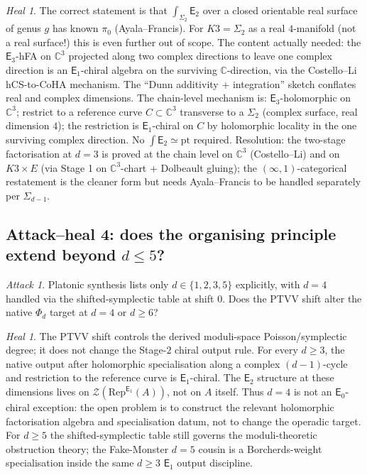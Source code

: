 \documentclass[11pt]{article}
\theoremstyle{definition}
\theoremstyle{remark}
\newtheorem{attack}[theorem]{Attack}
\newtheorem{heal}[theorem]{Heal}
\providecommand{\C}{\mathbb{C}}
\providecommand{\cZ}{\mathcal{Z}}
\providecommand{\Eone}{\mathsf{E}_1}
\providecommand{\Etwo}{\mathsf{E}_2}
\providecommand{\Ethree}{\mathsf{E}_3}
\providecommand{\Rep}{\mathrm{Rep}}
\providecommand{\Ezero}{\mathsf{E}_0}
\begin{document}
\begin{heal}
The correct statement is that $\int_{\Sigma_2}\Etwo$ over a closed
orientable real surface of genus $g$ has known $\pi_0$ (Ayala--Francis).
For $K3 = \Sigma_2$ as a real $4$-manifold (not a real surface!) this
is even further out of scope. The content actually needed: the
$\Ethree$-hFA on $\C^3$ projected along two complex directions to
leave one complex direction is an $\Eone$-chiral algebra on the
surviving $\C$-direction, via the Costello--Li hCS-to-CoHA mechanism.
The ``Dunn additivity + integration'' sketch conflates real and complex
dimensions. The chain-level mechanism is: $\Ethree$-holomorphic on
$\C^3$; restrict to a reference curve $C\subset\C^3$ transverse to a
$\Sigma_2$ (complex surface, real dimension $4$); the restriction is
$\Eone$-chiral on $C$ by holomorphic locality in the one surviving
complex direction. No $\int\Etwo\simeq\mathrm{pt}$ required.
Resolution: the two-stage factorisation at $d = 3$ is proved at the
chain level on $\C^3$ (Costello--Li) and on $K3\times E$ (via Stage 1
on $\C^3$-chart + Dolbeault gluing); the $(\infty,1)$-categorical
restatement is the cleaner form but needs Ayala--Francis to be handled
separately per $\Sigma_{d-1}$.
\end{heal}

\subsection{Attack--heal 4: does the organising principle extend
beyond $d \leq 5$?}

\begin{attack}
Platonic synthesis lists only $d \in \{1, 2, 3, 5\}$ explicitly, with
$d=4$ handled via the shifted-symplectic table at shift $0$. Does the
PTVV shift alter the native $\Phi_d$ target at $d = 4$ or $d\geq6$?
\end{attack}

\begin{heal}
The PTVV shift controls the derived moduli-space Poisson/symplectic
degree; it does not change the Stage-$2$ chiral output rule. For every
$d\geq3$, the native output after holomorphic specialisation along a
complex $(d-1)$-cycle and restriction to the reference curve is
$\Eone$-chiral. The $\Etwo$ structure at these dimensions lives on
$\cZ(\Rep^{\Eone}(A))$, not on $A$ itself. Thus $d=4$ is not an
$\Ezero$-chiral exception: the open problem is to construct the
relevant holomorphic factorisation algebra and specialisation datum,
not to change the operadic target. For $d\geq5$ the shifted-symplectic
table still governs the moduli-theoretic obstruction theory; the
Fake-Monster $d=5$ cousin is a Borcherds-weight specialisation inside
the same $d\geq3$ $\Eone$ output discipline.
\end{heal}
\end{document}
